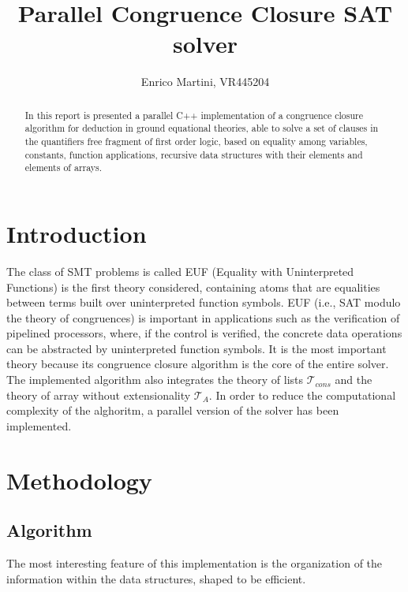 \documentclass{IEEEtran}
\begin{document}
\title{Parallel Congruence Closure SAT solver}
\author{Enrico Martini, VR445204}
\maketitle
\begin{abstract}
 In this report is presented a parallel C++ implementation of a congruence closure algorithm for deduction in ground equational theories, able to solve a set of clauses in the quantifiers free fragment of first order logic, based on equality among variables, constants, function applications, recursive data structures with their elements and elements of arrays.
\end{abstract}
\section{Introduction}
The class of SMT problems is called EUF (Equality with Uninterpreted Functions) is the first theory considered, containing atoms that are equalities between terms built over uninterpreted function symbols. EUF (i.e., SAT modulo the theory of congruences) is important in applications such as the verification of pipelined processors, where, if the control is verified, the concrete data operations can be abstracted by uninterpreted function symbols.\cite{NIEUWENHUIS2007557} It is the most important theory because its congruence closure algorithm is the core of the entire solver. The implemented algorithm also integrates the theory of lists $\mathcal{T}_{cons}$ and the theory of array without extensionality $\mathcal{T}_A$. In order to reduce the computational complexity of the alghoritm, a parallel version of the solver has been implemented.
\section{Methodology}
\subsection{Algorithm}
The most interesting feature of this implementation is the organization of the information within the data structures, shaped to be efficient.
\end{document}
